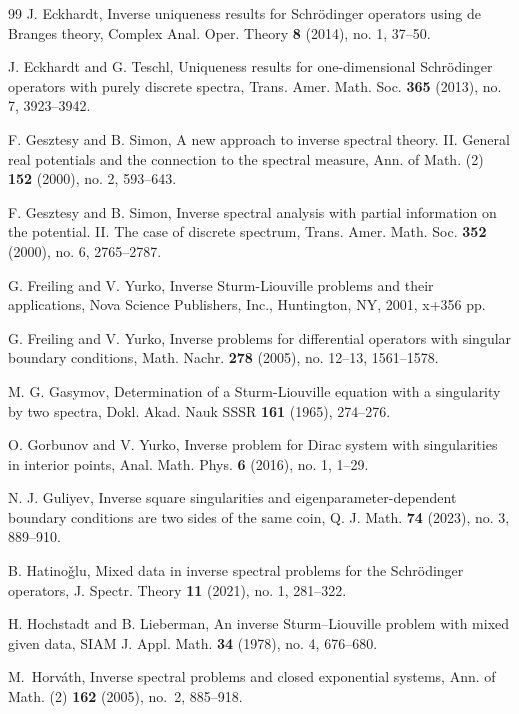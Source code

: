 \documentclass[reqno,12pt,centertags]{amsart}
\numberwithin{equation}{section}
\theoremstyle{definition}
\begin{document}
\begin{thebibliography}{99}
J. Eckhardt, 
Inverse uniqueness results for Schr\"{o}dinger operators using de Branges theory,
Complex Anal. Oper. Theory \textbf{8} (2014), no. 1, 37--50.

J. Eckhardt and G. Teschl,
Uniqueness results for one-dimensional Schr\"{o}dinger operators with purely discrete spectra,
Trans. Amer. Math. Soc. \textbf{365} (2013), no. 7, 3923--3942.

F. Gesztesy and B. Simon, 
A new approach to inverse spectral theory. II. General real potentials and the connection to the spectral measure,
Ann. of Math. (2) \textbf{152} (2000), no. 2, 593--643. 

F. Gesztesy and B. Simon, 
Inverse spectral analysis with partial information on the potential. II. The case of discrete spectrum,
Trans. Amer. Math. Soc. \textbf{352} (2000), no. 6, 2765--2787.

G. Freiling and V. Yurko,
Inverse Sturm-Liouville problems and their applications,
Nova Science Publishers, Inc., Huntington, NY, 2001, x+356 pp.

G. Freiling and V. Yurko,
Inverse problems for differential operators with singular boundary conditions,
Math. Nachr. \textbf{278} (2005), no. 12--13, 1561--1578.

M. G. Gasymov, 
Determination of a Sturm-Liouville equation with a singularity by two spectra,
Dokl. Akad. Nauk SSSR \textbf{161} (1965), 274–276.


O. Gorbunov and V. Yurko,
Inverse problem for Dirac system with singularities in interior points,
Anal. Math. Phys. \textbf{6} (2016), no. 1, 1--29.

N. J. Guliyev,
Inverse square singularities and eigenparameter-dependent boundary conditions are two sides of the same coin,
Q. J. Math. \textbf{74} (2023), no. 3, 889--910.

B. Hatino\v{g}lu, 
Mixed data in inverse spectral problems for the Schr\"{o}dinger operators,
J. Spectr. Theory \textbf{11} (2021), no. 1, 281--322.

H. Hochstadt and B. Lieberman, 
An inverse Sturm–Liouville problem with mixed given data,
SIAM J. Appl. Math. \textbf{34} (1978), no. 4, 676--680.

M.~Horv\'{a}th, 
Inverse spectral problems and closed exponential systems, 
Ann. of Math. (2) \textbf{162} (2005), no.~2, 885--918.



\end{thebibliography}
\end{document}
